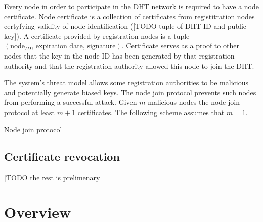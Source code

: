 Every node in order to participate in the DHT network is required to have a node
certificate. Node certificate is a collection of certificates from registitration
nodes certyfying validity of node identification ([TODO tuple of DHT ID and
public key]). A certificate provided by registration nodes is a tuple
$\left(\text{node}_{ID}, \, \text{expiration date}, \, \text{signature}\right)$.
Certificate serves as a proof to other nodes that the key in the node ID has been
generated by that registration authority and that the registration authority
allowed this node to join the DHT.

The system's threat model allows some registration authorities to be malicious
and potentially generate biased keys. The node join protocol prevents such nodes
from performing a successful attack. Given $m$ malicious nodes the node join
protocol at least $m+1$ certificates. The following scheme assumes that $m = 1$.

\begin{msc}{Node join protocol}
\setlength{\instdist}{5.5cm}
\setlength{\envinstdist}{3cm}
\nextlevel[2]
\nextlevel
{}
\nextlevel[4]
\nextlevel[2]
\nextlevel[2]
\nextlevel[2]
\nextlevel[2]
\nextlevel[2]
\nextlevel[2]
\nextlevel[2]
\nextlevel[1]
\end{msc}


\subsection{Certificate revocation}

[TODO the rest is prelimenary]
\section{Overview}


